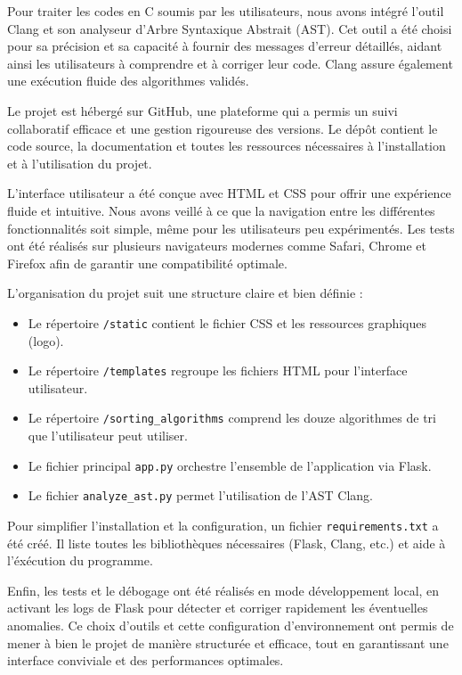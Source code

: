 \documentclass[a4paper, 12pt, twoside]{article}
\begin{document}
Pour traiter les codes en C soumis par les utilisateurs, nous avons intégré l'outil Clang et son analyseur d'Arbre Syntaxique Abstrait (AST). Cet outil a été choisi pour sa précision et sa capacité à fournir des messages d’erreur détaillés, aidant ainsi les utilisateurs à comprendre et à corriger leur code. Clang assure également une exécution fluide des algorithmes validés.
\newline

Le projet est hébergé sur GitHub, une plateforme qui a permis un suivi collaboratif efficace et une gestion rigoureuse des versions. Le dépôt contient le code source, la documentation et toutes les ressources nécessaires à l’installation et à l’utilisation du projet.
\newline

L’interface utilisateur a été conçue avec HTML et CSS pour offrir une expérience fluide et intuitive. Nous avons veillé à ce que la navigation entre les différentes fonctionnalités soit simple, même pour les utilisateurs peu expérimentés. Les tests ont été réalisés sur plusieurs navigateurs modernes comme Safari, Chrome et Firefox afin de garantir une compatibilité optimale.
\newline

L’organisation du projet suit une structure claire et bien définie :  
\begin{itemize}
    \item Le répertoire \texttt{/static} contient le fichier CSS et les ressources graphiques (logo).
    \item Le répertoire \texttt{/templates} regroupe les fichiers HTML pour l’interface utilisateur.
    \item Le répertoire \texttt{/sorting\_algorithms} comprend les douze algorithmes de tri que l’utilisateur peut utiliser.
    \item Le fichier principal \texttt{app.py} orchestre l’ensemble de l’application via Flask.
    \item Le fichier \texttt{analyze\_ast.py} permet l’utilisation de l’AST Clang.
\end{itemize}

Pour simplifier l’installation et la configuration, un fichier \texttt{requirements.txt} a été créé. Il liste toutes les bibliothèques nécessaires (Flask, Clang, etc.) et aide à l'éxécution du programme.  
\newline

Enfin, les tests et le débogage ont été réalisés en mode développement local, en activant les logs de Flask pour détecter et corriger rapidement les éventuelles anomalies.
\newline
Ce choix d’outils et cette configuration d’environnement ont permis de mener à bien le projet de manière structurée et efficace, tout en garantissant une interface conviviale et des performances optimales.
\end{document}

